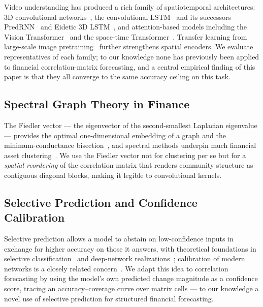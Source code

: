 \documentclass[runningheads]{llncs}
\begin{document}
Video understanding has produced a rich family of spatiotemporal
architectures: 3D convolutional networks~\cite{tran2015learning,carreira2017quo},
the convolutional LSTM~\cite{shi2015convolutional} and its successors
PredRNN~\cite{wang2017predrnn} and Eidetic 3D
LSTM~\cite{wang2018eidetic}, and attention-based models including the
Vision Transformer~\cite{dosovitskiy2021image} and the space-time
Transformer~\cite{bertasius2021space}. Transfer learning from
large-scale image pretraining~\cite{tan2019efficientnet} further
strengthens spatial encoders. We evaluate representatives of each family;
to our knowledge none has previously been applied to financial
correlation-matrix forecasting, and a central empirical finding of this
paper is that they all converge to the same accuracy ceiling on this task.

\subsection{Spectral Graph Theory in Finance}

The Fiedler vector --- the eigenvector of the second-smallest Laplacian
eigenvalue --- provides the optimal one-dimensional embedding of a graph
and the minimum-conductance bisection~\cite{fiedler1973algebraic}, and
spectral methods underpin much financial asset
clustering~\cite{mantegni1999hierarchical,marti2021review}. We use the
Fiedler vector not for clustering per se but for a \emph{spatial
reordering} of the correlation matrix that renders community structure as
contiguous diagonal blocks, making it legible to convolutional kernels.

\subsection{Selective Prediction and Confidence Calibration}

Selective prediction allows a model to abstain on low-confidence inputs
in exchange for higher accuracy on those it answers, with theoretical
foundations in selective classification~\cite{elyaniv2010foundations} and
deep-network realizations~\cite{geifman2017selective}; calibration of
modern networks is a closely related concern~\cite{guo2017calibration}.
We adapt this idea to correlation forecasting by using the model's own
predicted change magnitude as a confidence score, tracing an
accuracy--coverage curve over matrix cells --- to our knowledge a novel
use of selective prediction for structured financial forecasting.
\end{document}
